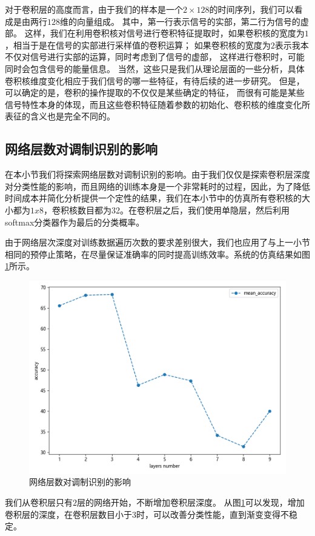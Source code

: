 对于卷积层的高度而言，由于我们的样本是一个$2\times128$的时间序列，我们可以看成是由两行$128$维的向量组成。
其中，第一行表示信号的实部，第二行为信号的虚部。
这样，我们在利用卷积核对信号进行卷积特征提取时，如果卷积核的宽度为$1$，相当于是在信号的实部进行采样值的卷积运算；
如果卷积核的宽度为$2$表示我本不仅对信号进行实部的运算，同时考虑到了信号的虚部，
这样进行卷积时，可能同时会包含信号的能量信息。
当然，这些只是我们从理论层面的一些分析，具体卷积核维度变化相应于我们信号的哪一些特征，有待后续的进一步研究。
但是，可以确定的是，卷积的操作提取的不仅仅是某些确定的特征，
而很有可能是某些信号特性本身的体现，而且这些卷积特征随着参数的初始化、卷积核的维度变化所表征的含义也是完全不同的。\par

\subsection{网络层数对调制识别的影响}
在本小节我们将探索网络层数对调制识别的影响。由于我们仅仅是探索卷积层深度对分类性能的影响，而且网络的训练本身是一个非常耗时的过程，因此，为了降低时间成本并简化分析提供一个定性的结果，我们在本小节中的仿真所有卷积核的大小都为$1x8$，卷积核数目都为32。在卷积层之后，我们使用单隐层，然后利用softmax分类器作为最后的分类概率。\par
由于网络层次深度对训练数据遍历次数的要求差别很大，我们也应用了与上一小节相同的预停止策略，在尽量保证准确率的同时提高训练效率。系统的仿真结果如图\ref{sec:fig_5_3}所示。\par
\begin{figure}[!h]
	\centering
	\includegraphics[scale=1.1]{figures/chapter_5/fig_5_3}
	\caption{网络层数对调制识别的影响}\label{sec:fig_5_3}
\end{figure}
我们从卷积层只有$2$层的网络开始，不断增加卷积层深度。
从图\ref{sec:fig_5_3}可以发现，增加卷积层的深度，在卷积层数目小于3时，可以改善分类性能，直到渐变变得不稳定。\par

